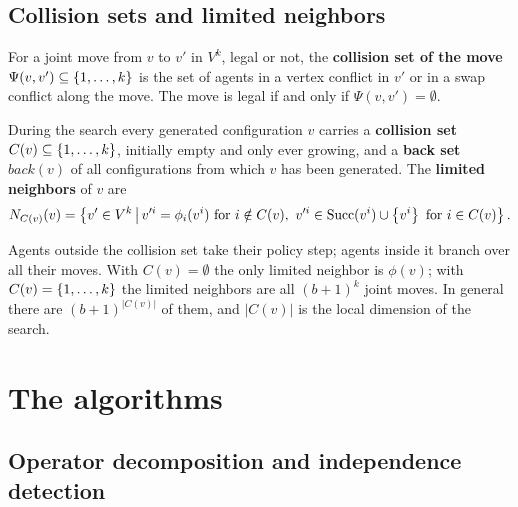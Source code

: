 \subsection{Collision sets and limited neighbors}

\begin{definition}
\label{def:ch11-collision}
For a joint move from $v$ to $v'$ in $V^k$, legal or not, the
\textbf{collision set of the move} $\Psi(v, v')
\subseteq \left\{ 1, \dots, k \right\}$ is the set of agents in a vertex conflict in
$v'$ or in a swap conflict along the move. The move is legal if and only if
$\Psi(v, v') = \emptyset$.
\end{definition}

\begin{definition}
\label{def:ch11-limited}
During the search every generated configuration $v$ carries a
\textbf{collision set} $C(v) \subseteq \left\{ 1, \dots, k \right\}$, initially empty
and only ever growing, and a \textbf{back set}
$\mathit{back}(v)$ of all configurations from which $v$ has been generated.
The \textbf{limited neighbors} of $v$ are
\begin{equation}
  N_{C(v)}(v) = \left\{ v' \in V^k \,\middle|\, v'^i = \phi_i(v^i) \text{ for } i \notin C(v),\
                      v'^i \in \operatorname{Succ}(v^i) \cup \left\{ v^i \right\} \text{ for } i \in C(v) \right\}.
  \label{eq:ch11-limited}
\end{equation}
\end{definition}

Agents outside the collision set take their policy step; agents inside it
branch over all their moves. With $C(v) = \emptyset$ the only limited
neighbor is $\phi(v)$; with $C(v) = \left\{ 1,\dots,k \right\}$ the limited
neighbors are all $(b+1)^k$ joint moves. In general there are
$(b+1)^{|C(v)|}$ of them, and $|C(v)|$ is the local dimension of the search.

\section{The algorithms}
\label{sec:ch11-algorithm}

\subsection{Operator decomposition and independence detection}
\label{sec:ch11-id}

